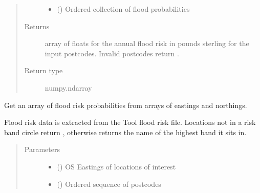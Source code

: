 \documentclass[letterpaper,10pt,english]{sphinxmanual}
\begin{document}
\begin{fulllineitems}
\begin{fulllineitems}
\begin{quote}
\begin{description}
\begin{itemize}
\item {} 
 () \textendash{} Ordered collection of flood probabilities

\end{itemize}

\item[{Returns}] \leavevmode
array of floats for the annual flood risk in pounds sterling for the input postcodes.
Invalid postcodes return .

\item[{Return type}] \leavevmode
numpy.ndarray

\end{description}\end{quote}

\end{fulllineitems}


\begin{fulllineitems}
\label{\detokenize{index:flood_tool.Tool.get_easting_northing_flood_probability}}
Get an array of flood risk probabilities from arrays of eastings and northings.

Flood risk data is extracted from the Tool flood risk file. Locations
not in a risk band circle return , otherwise returns the name of the
highest band it sits in.
\begin{quote}\begin{description}
\item[{Parameters}] \leavevmode\begin{itemize}
\item {} 
 () \textendash{} OS Eastings of locations of interest

\item {} 
 () \textendash{} Ordered sequence of postcodes

\end{itemize}


\end{description}
\end{quote}
\end{fulllineitems}
\end{fulllineitems}
\end{document}

